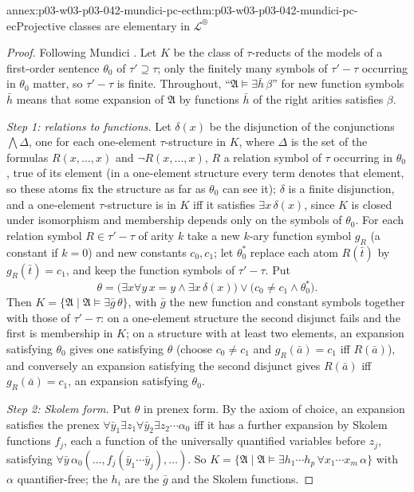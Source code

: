 \begin{annexitem}{annex:p03-w03-p03-042-mundici-pc-ec}{thm:p03-w03-p03-042-mundici-pc-ec}{Projective classes are elementary in \(\mathscr L^{\circledR}\)}
\begin{proof}
Following Mundici \cite[p.~213]{Mundici1985OtherQuantifiers}.  Let \(K\)
be the class of \(\tau\)-reducts of the models of a first-order sentence
\(\theta_0\) of \(\tau'\supseteq\tau\); only the finitely many symbols of
\(\tau'-\tau\) occurring in \(\theta_0\) matter, so \(\tau'-\tau\) is
finite.  Throughout, ``\(\mathfrak A\models\exists\bar h\,\beta\)'' for
new function symbols \(\bar h\) means that some expansion of \(\mathfrak
A\) by functions \(\bar h\) of the right arities satisfies \(\beta\).

\emph{Step 1: relations to functions.}  Let \(\delta(x)\) be the
disjunction of the conjunctions \(\bigwedge\Delta\), one for each
one-element \(\tau\)-structure in \(K\), where \(\Delta\) is the set of the
formulas \(R(x,\ldots,x)\) and \(\neg R(x,\ldots,x)\), \(R\) a relation
symbol of \(\tau\) occurring in \(\theta_0\), true of its element (in a
one-element structure every term denotes that element, so these atoms fix
the structure as far as \(\theta_0\) can see it); \(\delta\) is a finite
disjunction, and a one-element
\(\tau\)-structure is in \(K\) iff it satisfies \(\exists x\,\delta(x)\),
since \(K\) is closed under isomorphism and membership depends only on the
symbols of \(\theta_0\).  For each relation symbol \(R\in\tau'-\tau\) of
arity \(k\) take a new \(k\)-ary function symbol \(g_R\) (a constant if
\(k=0\)) and new constants \(c_0,c_1\); let \(\theta_0^\ast\) replace
each atom \(R(\bar t)\) by \(g_R(\bar t)=c_1\), and keep the function
symbols of \(\tau'-\tau\).  Put
\[
 \theta=\bigl(\exists x\forall y\,x=y\wedge\exists x\,\delta(x)\bigr)\vee
 \bigl(c_0\neq c_1\wedge\theta_0^\ast\bigr).
\]
Then \(K=\{\mathfrak A\mid\mathfrak A\models\exists\bar g\,\theta\}\), with
\(\bar g\) the new function and constant symbols together with those of
\(\tau'-\tau\): on a one-element structure the second disjunct fails and
the first is membership in \(K\); on a structure with at least two
elements, an expansion satisfying \(\theta_0\) gives one satisfying
\(\theta\) (choose \(c_0\neq c_1\) and \(g_R(\bar a)=c_1\) iff
\(R(\bar a)\)), and conversely an expansion satisfying the second disjunct
gives \(R(\bar a)\) iff \(g_R(\bar a)=c_1\), an expansion satisfying
\(\theta_0\).

\emph{Step 2: Skolem form.}  Put \(\theta\) in prenex form.  By the axiom
of choice, an expansion satisfies the prenex \(\forall\bar y_1\exists
z_1\forall\bar y_2\exists z_2\cdots\alpha_0\) iff it has a further
expansion by Skolem functions \(f_j\), each a function of the universally
quantified variables before \(z_j\), satisfying \(\forall\bar y\,
\alpha_0(\ldots,f_j(\bar y_1\cdots\bar y_j),\ldots)\).  So
\(K=\{\mathfrak A\mid\mathfrak A\models\exists h_1\cdots h_p\,\forall
x_1\cdots x_m\,\alpha\}\) with \(\alpha\) quantifier-free; the \(h_i\) are
the \(\bar g\) and the Skolem functions.


\end{proof}
\end{annexitem}
